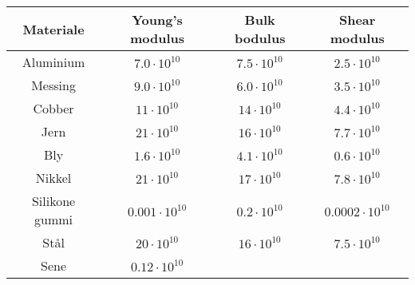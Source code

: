 \begin{tabular}{|c|c|c|c|}
	\hline
	Materiale&Young's modulus&Bulk bodulus&Shear modulus\\
	\hline
	Aluminium&$7.0\cdot 10^{10}$&$7.5\cdot 10^{10}$&$2.5\cdot 10^{10}$\\
	Messing&$9.0\cdot 10^{10}$&$6.0\cdot 10^{10}$&$3.5\cdot 10^{10}$\\
	Cobber&$11\cdot 10^{10}$&$14\cdot 10^{10}$&$4.4\cdot 10^{10}$\\
	Jern&$21\cdot 10^{10}$&$16\cdot 10^{10}$&$7.7\cdot 10^{10}$\\
	Bly&$1.6\cdot 10^{10}$&$4.1\cdot 10^{10}$&$0.6\cdot 10^{10}$\\
	Nikkel&$21\cdot 10^{10}$&$17\cdot 10^{10}$&$7.8\cdot 10^{10}$\\
	Silikone gummi&$0.001\cdot 10^{10}$&$0.2\cdot 10^{10}$&$0.0002\cdot 10^{10}$\\
	Stål&$20\cdot 10^{10}$&$16\cdot 10^{10}$&$7.5\cdot 10^{10}$\\
	Sene&$0.12\cdot 10^{10}$&&\\
	\hline
\end{tabular}